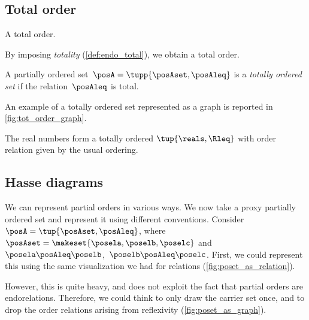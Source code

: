 \vfill

\subsection{Total order}
\begin{marginfigure}
    \centering
    \caption{A total order.}
    \label{fig:tot_order_graph}
\end{marginfigure}
By imposing \emph{totality} (\cref{def:endo_total}), we obtain a total order.

\begin{ctdefinition}
    \label{def:total_order}
    A partially ordered set~$\posA = \tupp{\posAset,\posAleq}$ is a \emph{totally ordered set} if the relation~$\posAleq$ is total.
\end{ctdefinition}

An example of a totally ordered set represented as a graph is reported in \cref{fig:tot_order_graph}.

\begin{example}[Reals]
    The real numbers \reals form a totally ordered  $\tup{\reals, \Rleq}$ with order relation given by the usual ordering.
\end{example}
\vfill
\clearpage

\subsection{Hasse diagrams}
We can represent partial orders in various ways.
We now take a proxy partially ordered set and represent it using different conventions.
Consider~$\posA=\tup{\posAset,\posAleq}$, where~$\posAset=\makeset{\posela,\poselb,\poselc}$ and~$\posela\posAleq \poselb$,~$\poselb\posAleq \poselc$.
First, we could represent this using the same visualization we had for relations (\cref{fig:poset_as_relation}).

However, this is quite heavy, and does not exploit the fact that partial orders are endorelations.
Therefore, we could think to only draw the carrier set once, and to drop the order relations arising from reflexivity (\cref{fig:poset_as_graph}).

